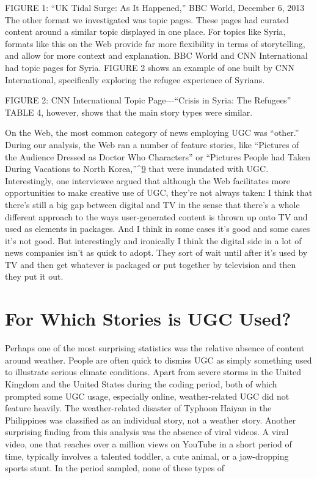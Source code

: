 \begin{enumerate}
FIGURE 1: ``UK Tidal Surge: As It Happened,'' BBC World, December 6, 2013
The other format we investigated was topic pages. These pages had curated
content around a similar topic displayed in one place. For topics like Syria,
formats like this on the Web provide far more flexibility in terms of storytelling,
and allow for more context and explanation. BBC World and CNN
International had topic pages for Syria. FIGURE 2 shows an example of one
built by CNN International, specifically exploring the refugee experience
of Syrians.

FIGURE 2: CNN International Topic Page—``Crisis in Syria: The Refugees''
TABLE 4, however, shows that the main story types were similar.


On the Web, the most common category of news employing UGC was
``other.'' During our analysis, the Web ran a number of feature stories, like
``Pictures of the Audience Dressed as Doctor Who Characters'' or ``Pictures
People had Taken During Vacations to North Korea,''^{\href{#endnotes}{9}} that were inundated
with UGC.
Interestingly, one interviewee argued that although the Web facilitates
more opportunities to make creative use of UGC, they're not always taken:
I think that there's still a big gap between digital and TV in the sense
that there's a whole different approach to the ways user-generated
content is thrown up onto TV and used as elements in packages.
And I think in some cases it's good and some cases it's not good. But
interestingly and ironically I think the digital side in a lot of news
companies isn't as quick to adopt. They sort of wait until after it's
used by TV and then get whatever is packaged or put together by
television and then they put it out.
\section{For Which Stories is UGC Used?}
Perhaps one of the most surprising statistics was the relative absence of
content around weather. People are often quick to dismiss UGC as simply
something used to illustrate serious climate conditions. Apart from
severe storms in the United Kingdom and the United States during the coding
period, both of which prompted some UGC usage, especially online,
weather-related UGC did not feature heavily. The weather-related disaster
of Typhoon Haiyan in the Philippines was classified as an individual story,
not a weather story.
Another surprising finding from this analysis was the absence of viral videos.
A viral video, one that reaches over a million views on YouTube in a
short period of time, typically involves a talented toddler, a cute animal, or
a jaw-dropping sports stunt. In the period sampled, none of these types of


\end{enumerate}
